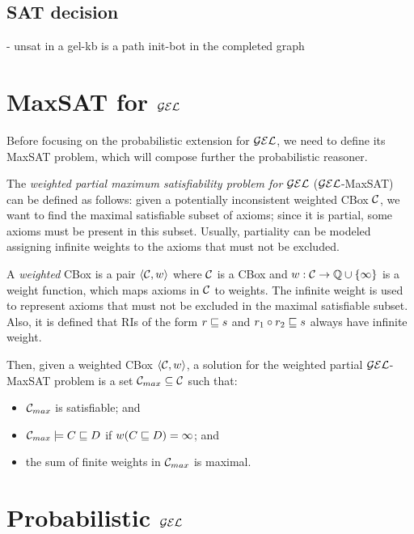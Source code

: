 \subsection{SAT decision}


- unsat in a gel-kb is a path init-bot in the completed graph



\section{MaxSAT for \texorpdfstring{$\mathcal{GEL}$}{𝓖𝓔𝓛}}
\label{sec:maxgel}

Before focusing on the probabilistic extension for $\mathcal{GEL}$, we need to define its MaxSAT problem, which will compose further the probabilistic reasoner.

The \emph{weighted partial maximum satisfiability problem for} $\mathcal{GEL}$ ($\mathcal{GEL}$-MaxSAT) can be defined as follows: given a potentially inconsistent weighted CBox $\mathcal{C}$, we want to find the maximal satisfiable subset of axioms; since it is partial, some axioms must be present in this subset. Usually, partiality can be modeled assigning infinite weights to the axioms that must not be excluded.

A \emph{weighted} CBox is a pair $\langle\mathcal{C}, w\rangle$ where $\mathcal{C}$ is a CBox and $w: \mathcal{C} \to \mathbb{Q} \cup \{\infty\}$ is a weight function, which maps axioms in $\mathcal{C}$ to weights. The infinite weight is used to represent axioms that must not be excluded in the maximal satisfiable subset. Also, it is defined that RIs of the form $r \sqsubseteq s$ and $r_1 \circ r_2 \sqsubseteq s$ always have infinite weight.

Then, given a weighted CBox $\langle\mathcal{C}, w\rangle$, a solution for the weighted partial $\mathcal{GEL}$-MaxSAT problem is a set $\mathcal{C}_{max} \subseteq \mathcal{C}$ such that:
\begin{itemize}
	\item $\mathcal{C}_{max}$ is satisfiable; and
	\item $\mathcal{C}_{max} \models C \sqsubseteq D$ if $w(C \sqsubseteq D) = \infty$; and
	\item the sum of finite weights in $\mathcal{C}_{max}$ is maximal.
\end{itemize}

\section{Probabilistic \texorpdfstring{$\mathcal{GEL}$}{𝓖𝓔𝓛}}
\label{sec:pgel}

